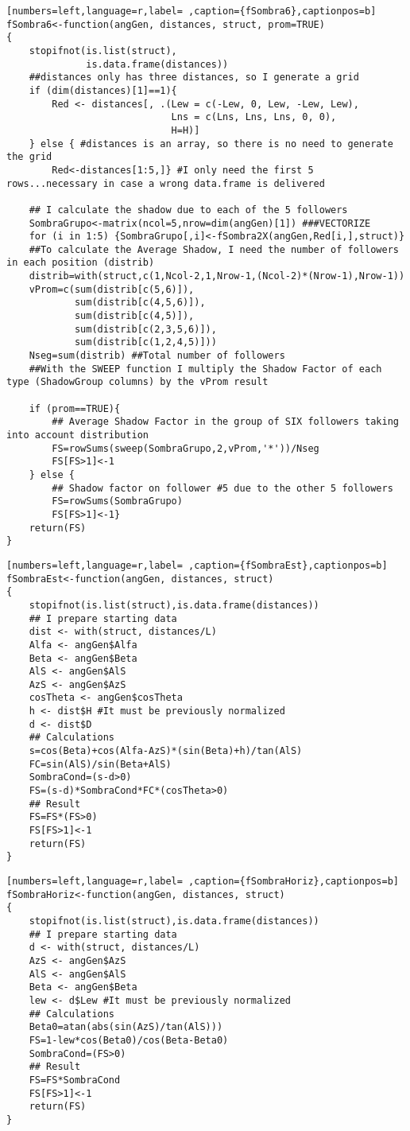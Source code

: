 \begin{lstlisting}[numbers=left,language=r,label= ,caption={fSombra6},captionpos=b]
fSombra6<-function(angGen, distances, struct, prom=TRUE)
{
    stopifnot(is.list(struct),
              is.data.frame(distances))
    ##distances only has three distances, so I generate a grid
    if (dim(distances)[1]==1){ 
        Red <- distances[, .(Lew = c(-Lew, 0, Lew, -Lew, Lew),
                             Lns = c(Lns, Lns, Lns, 0, 0),
                             H=H)]
    } else { #distances is an array, so there is no need to generate the grid
        Red<-distances[1:5,]} #I only need the first 5 rows...necessary in case a wrong data.frame is delivered

    ## I calculate the shadow due to each of the 5 followers
    SombraGrupo<-matrix(ncol=5,nrow=dim(angGen)[1]) ###VECTORIZE
    for (i in 1:5) {SombraGrupo[,i]<-fSombra2X(angGen,Red[i,],struct)}
    ##To calculate the Average Shadow, I need the number of followers in each position (distrib)
    distrib=with(struct,c(1,Ncol-2,1,Nrow-1,(Ncol-2)*(Nrow-1),Nrow-1)) 
    vProm=c(sum(distrib[c(5,6)]),
            sum(distrib[c(4,5,6)]),
            sum(distrib[c(4,5)]),
            sum(distrib[c(2,3,5,6)]),
            sum(distrib[c(1,2,4,5)]))
    Nseg=sum(distrib) ##Total number of followers
    ##With the SWEEP function I multiply the Shadow Factor of each type (ShadowGroup columns) by the vProm result

    if (prom==TRUE){
        ## Average Shadow Factor in the group of SIX followers taking into account distribution
        FS=rowSums(sweep(SombraGrupo,2,vProm,'*'))/Nseg
        FS[FS>1]<-1
    } else {		
        ## Shadow factor on follower #5 due to the other 5 followers
        FS=rowSums(SombraGrupo)
        FS[FS>1]<-1}
    return(FS)
}
\end{lstlisting}
\begin{lstlisting}[numbers=left,language=r,label= ,caption={fSombraEst},captionpos=b]
fSombraEst<-function(angGen, distances, struct)
{
    stopifnot(is.list(struct),is.data.frame(distances))
    ## I prepare starting data
    dist <- with(struct, distances/L)
    Alfa <- angGen$Alfa
    Beta <- angGen$Beta
    AlS <- angGen$AlS
    AzS <- angGen$AzS
    cosTheta <- angGen$cosTheta
    h <- dist$H #It must be previously normalized
    d <- dist$D                   
    ## Calculations
    s=cos(Beta)+cos(Alfa-AzS)*(sin(Beta)+h)/tan(AlS)
    FC=sin(AlS)/sin(Beta+AlS)
    SombraCond=(s-d>0)
    FS=(s-d)*SombraCond*FC*(cosTheta>0)
    ## Result
    FS=FS*(FS>0)
    FS[FS>1]<-1
    return(FS)
}
\end{lstlisting}
\begin{lstlisting}[numbers=left,language=r,label= ,caption={fSombraHoriz},captionpos=b]
fSombraHoriz<-function(angGen, distances, struct)
{
    stopifnot(is.list(struct),is.data.frame(distances))
    ## I prepare starting data 	
    d <- with(struct, distances/L)
    AzS <- angGen$AzS
    AlS <- angGen$AlS
    Beta <- angGen$Beta
    lew <- d$Lew #It must be previously normalized
    ## Calculations
    Beta0=atan(abs(sin(AzS)/tan(AlS)))
    FS=1-lew*cos(Beta0)/cos(Beta-Beta0)
    SombraCond=(FS>0)
    ## Result
    FS=FS*SombraCond
    FS[FS>1]<-1
    return(FS)
}
\end{lstlisting}
